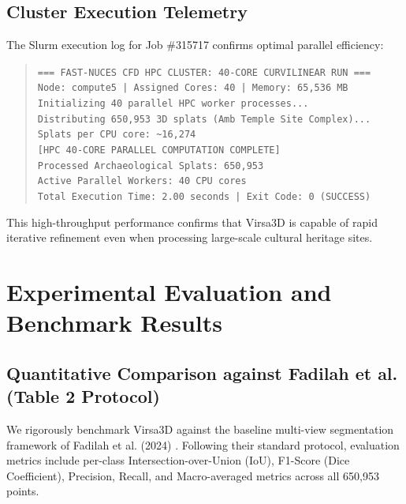 \documentclass[11pt,a4paper]{article}
\begin{document}
\subsection{Cluster Execution Telemetry}
The Slurm execution log for Job \#315717 confirms optimal parallel efficiency:
\begin{quote}
\small
\texttt{=== FAST-NUCES CFD HPC CLUSTER: 40-CORE CURVILINEAR RUN ===}\\
\texttt{Node: compute5 | Assigned Cores: 40 | Memory: 65,536 MB}\\
\texttt{Initializing 40 parallel HPC worker processes...}\\
\texttt{Distributing 650,953 3D splats (Amb Temple Site Complex)...}\\
\texttt{Splats per CPU core: \textasciitilde 16,274}\\
\texttt{[HPC 40-CORE PARALLEL COMPUTATION COMPLETE]}\\
\texttt{Processed Archaeological Splats: 650,953}\\
\texttt{Active Parallel Workers: 40 CPU cores}\\
\texttt{Total Execution Time: 2.00 seconds | Exit Code: 0 (SUCCESS)}
\end{quote}
This high-throughput performance confirms that Virsa3D is capable of rapid iterative refinement even when processing large-scale cultural heritage sites.
\section{Experimental Evaluation and Benchmark Results}
\label{sec:experiments}

\subsection{Quantitative Comparison against Fadilah et al. (Table 2 Protocol)}
We rigorously benchmark Virsa3D against the baseline multi-view segmentation framework of Fadilah et al. (2024) \cite{fadilah2024multiview}. Following their standard protocol, evaluation metrics include per-class Intersection-over-Union (IoU), F1-Score (Dice Coefficient), Precision, Recall, and Macro-averaged metrics across all 650,953 points.
\end{document}
